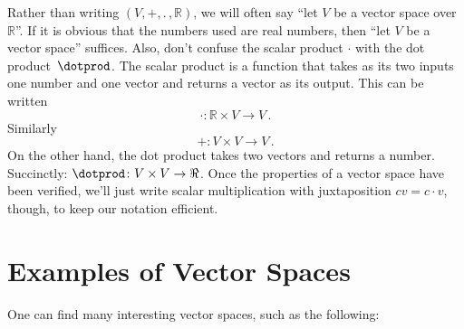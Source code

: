 \begin{remark}
Rather than writing $(V,+,.\, ,{\mathbb R})$, we will often say ``let $V$ be a vector space over ${\mathbb R}$''. If it is obvious that the numbers used are real numbers, then ``let $V$ be a vector space'' suffices.
Also, don't confuse the scalar product $\cdot$ with the dot product~$\dotprod$.  The scalar product is a function that takes as its two inputs one number and one vector  and returns a vector as its output.  This can be written 
\[\cdot \colon \mathbb{R}\times V \rightarrow V\, .\] 
Similarly
\[
+:V\times V \rightarrow V\, .
\]
On the other hand, the dot product takes two vectors and returns a number.  Succinctly: $\dotprod \colon V\times V \rightarrow \Re$.
Once the properties of a vector space have been verified, we'll just write scalar multiplication with juxtaposition $cv=c\cdot v$, though, to keep our notation efficient. 
\end{remark}


\section{Examples of Vector Spaces}

One can  find many interesting vector spaces, such as the following:

